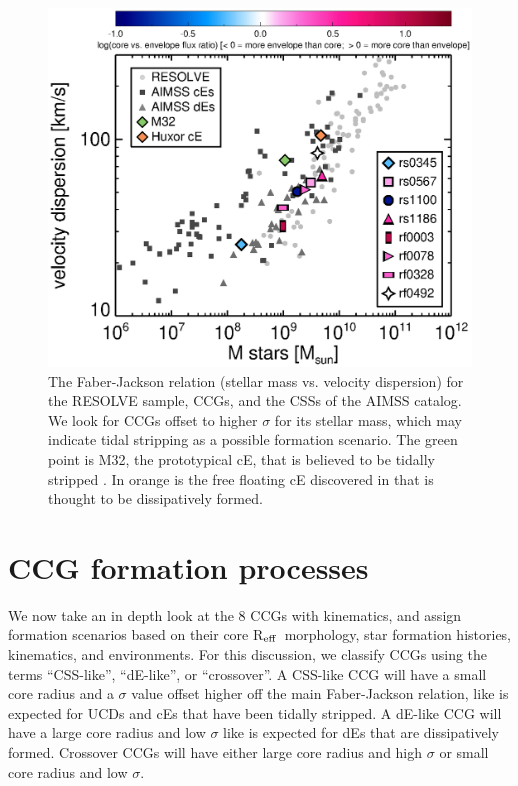 \documentclass[iop,apj]{emulateapj}
\newcommand{\Reff}{R$_{\rm eff}$}
\begin{document}
\begin{figure}[b]
\begin{center}
\includegraphics{faber-jackson_resolvesigmas.eps}
\caption{The Faber-Jackson relation (stellar mass vs. velocity dispersion) for the RESOLVE sample, CCGs, and the CSSs of the AIMSS catalog. We look for CCGs offset to higher $\sigma$ for its stellar mass, which may indicate tidal stripping as a possible formation scenario. The green point is M32, the prototypical cE, that is believed to be tidally stripped \citep{Faber1973}. In orange is the free floating cE discovered in \citet{Huxor2013} that is thought to be dissipatively formed.}
\label{fig:sigma}
\end{center}
\end{figure}

\section{CCG formation processes} %
\label{discussion}

\noindent We now take an in depth look at the 8 CCGs with kinematics, and assign formation scenarios based on their core \Reff\, morphology, star formation histories, kinematics, and environments. For this discussion, we classify CCGs using the terms ``CSS-like'', ``dE-like'', or ``crossover''.  A CSS-like CCG will have a small core radius and a $\sigma$ value offset higher off the main Faber-Jackson relation, like is expected for UCDs and cEs that have been tidally stripped. A dE-like CCG will have a large core radius and low $\sigma$ like is expected for dEs that are dissipatively formed. Crossover CCGs will have either large core radius and high $\sigma$ or small core radius and low $\sigma$. 
\end{document}
